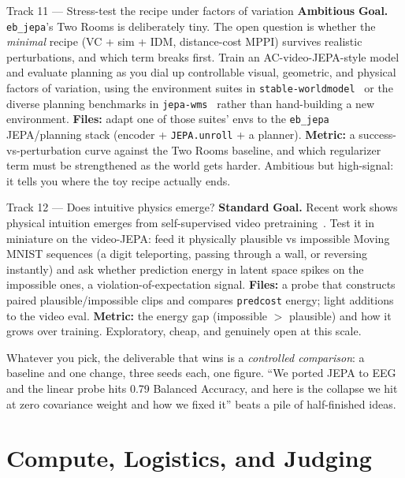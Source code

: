\documentclass{article}
\newcommand{\code}[1]{\texttt{\small #1}}
\newcommand{\diffmed}{\colorbox{ebamber!18}{\textcolor{ebamber}{\small\bfseries Standard}}}
\newcommand{\diffhard}{\colorbox{ebred!15}{\textcolor{ebred}{\small\bfseries Ambitious}}}
\begin{document}
\begin{trackbox}{Track 11 --- Stress-test the recipe under factors of variation \hfill \diffhard{}}
\textbf{Goal.} \texttt{eb\_jepa}'s Two Rooms is deliberately tiny. The open question
is whether the \emph{minimal} recipe (VC + sim + IDM, distance-cost MPPI) survives
realistic perturbations, and which term breaks first. Train an AC-video-JEPA-style
model and evaluate planning as you dial up controllable visual, geometric, and
physical factors of variation, using the environment suites in
\texttt{stable-worldmodel}~\citep{stableworldmodel} or the diverse planning
benchmarks in \texttt{jepa-wms}~\citep{terver2026JEPAWMs} rather than hand-building a
new environment. \textbf{Files:} adapt one of those suites' envs to the
\code{eb\_jepa} JEPA/planning stack (encoder + \code{JEPA.unroll} + a planner).
\textbf{Metric:} a success-vs-perturbation curve against the Two Rooms baseline, and
which regularizer term must be strengthened as the world gets harder. Ambitious but
high-signal: it tells you where the toy recipe actually ends.
\end{trackbox}

\begin{trackbox}{Track 12 --- Does intuitive physics emerge? \hfill \diffmed{}}
\textbf{Goal.} Recent work shows physical intuition emerges from self-supervised
video pretraining~\citep{garrido2025intuitivephysicsunderstandingemerges}. Test it
in miniature on the video-JEPA: feed it physically plausible vs impossible Moving
MNIST sequences (a digit teleporting, passing through a wall, or reversing
instantly) and ask whether prediction energy in latent space spikes on the
impossible ones, a violation-of-expectation signal. \textbf{Files:} a probe that
constructs paired plausible/impossible clips and compares \code{predcost} energy;
light additions to the video eval. \textbf{Metric:} the energy gap (impossible $>$
plausible) and how it grows over training. Exploratory, cheap, and genuinely
open at this scale.
\end{trackbox}

\begin{tipbox}
Whatever you pick, the deliverable that wins is a \emph{controlled comparison}: a
baseline and one change, three seeds each, one figure. ``We ported JEPA to EEG and
the linear probe hits 0.79 Balanced Accuracy, and here is the collapse we hit at
zero covariance weight and how we fixed it'' beats a pile of half-finished ideas.
\end{tipbox}
\section{Compute, Logistics, and Judging}
\label{sec:logistics}
\end{document}
